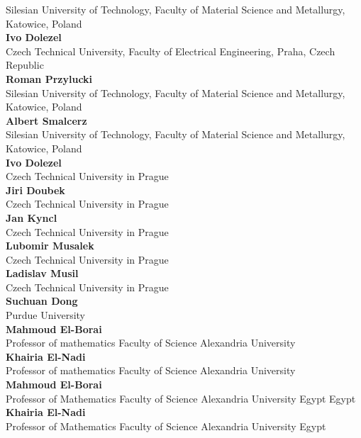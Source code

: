 \documentclass[article,A4,11pt]{llncs}%
\begin{document}
    Silesian University of Technology, Faculty of Material Science and Metallurgy, Katowice, Poland\\
        \noindent
    {\bf Ivo Dolezel}\\
    Czech Technical University, Faculty of Electrical Engineering, Praha, Czech Republic\\
        \noindent
    {\bf Roman Przylucki}\\
    Silesian University of Technology, Faculty of Material Science and Metallurgy, Katowice, Poland\\
        \noindent
    {\bf Albert Smalcerz}\\
    Silesian University of Technology, Faculty of Material Science and Metallurgy, Katowice, Poland\\
        \noindent
    {\bf Ivo Dolezel}\\
    Czech Technical University in Prague\\
        \noindent
    {\bf Jiri Doubek}\\
    Czech Technical University in Prague\\
        \noindent
    {\bf Jan Kyncl}\\
    Czech Technical University in Prague\\
        \noindent
    {\bf Lubomir Musalek}\\
    Czech Technical University in Prague\\
        \noindent
    {\bf Ladislav Musil}\\
    Czech Technical University in Prague\\
        \noindent
    {\bf Suchuan Dong}\\
    Purdue University\\
        \noindent
    {\bf Mahmoud El-Borai}\\
    Professor of mathematics Faculty of Science Alexandria University\\
        \noindent
    {\bf Khairia El-Nadi}\\
    Professor of mathematics Faculty of Science Alexandria University\\
        \noindent
    {\bf Mahmoud El-Borai}\\
    Professor of Mathematics Faculty of Science Alexandria University Egypt Egypt\\
        \noindent
    {\bf Khairia El-Nadi}\\
    Professor of Mathematics Faculty of Science Alexandria University  Egypt\\
\end{document}
